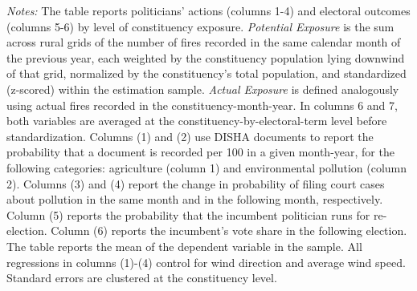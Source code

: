 \documentclass[12pt]{article}
\let\SourceInput
\renewcommand{}[1]{%
  \IfFileExists{../../#1}{\SourceInput{../../#1}}{%
    \IfFileExists{../../#1.tex}{\SourceInput{../../#1.tex}}{%
      \fbox{\scriptsize Missing table: \detokenize{#1}}}}}
\begin{document}
\begin{table}[htbp!] 
\caption{Pollution Exposure, Politicians' Actions, and Electoral Consequences, rural grid $\times$ Count $\times$ Downwind Pop }\label{tab:mechanism}
        \resizebox{\linewidth}{!}{
        
        }
    \begin{minipage}{\textwidth}
        {\footnotesize \textit{Notes:} The table reports politicians' actions (columns 1-4) and electoral outcomes (columns 5-6) by level of constituency exposure.
        \textit{Potential Exposure} is the sum across rural grids of the number of fires  recorded in the same calendar month of the previous year, each weighted by the  constituency population lying downwind of that grid, normalized by the  constituency's total population, and standardized (z-scored) within the  estimation sample.
       \textit{Actual Exposure} is defined analogously using actual fires recorded in the   constituency-month-year. In columns 6 and 7, both variables are averaged at  the constituency-by-electoral-term level before standardization.
        Columns (1) and (2) use DISHA documents to report the probability that a document is recorded per 100 in a given month-year, for the following categories: agriculture (column 1) and environmental pollution (column 2). Columns (3) and (4) report the change in probability of filing court cases about pollution in the same month and in the following month, respectively. Column (5) reports the probability that the incumbent politician runs for re-election. Column (6) reports the incumbent's vote share in the following election.
        The table reports the mean of the dependent variable in the sample. All regressions in columns (1)-(4) control for wind direction and average wind speed. Standard errors are clustered at the constituency level.
        }
    \end{minipage}
\end{table}
\end{document}
